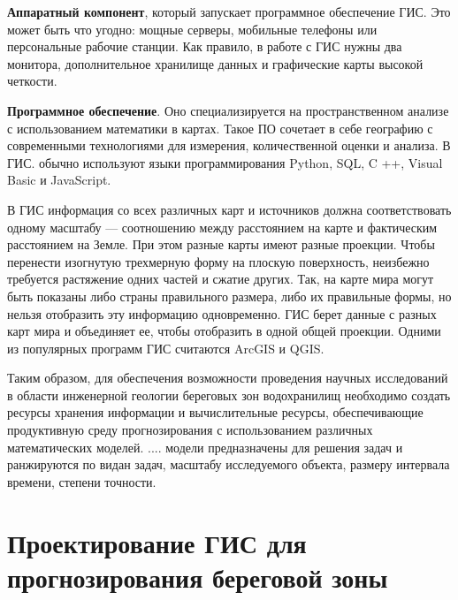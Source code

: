 \documentclass[732,14pt,final]{studrep}
\begin{document}
\textbf{Аппаратный компонент}, который запускает программное обеспечение ГИС. Это может быть что угодно: мощные серверы, мобильные телефоны или персональные рабочие станции. Как правило, в работе с ГИС нужны два монитора, дополнительное хранилище данных и графические карты высокой четкости.

\textbf{Программное обеспечение}. Оно специализируется на пространственном анализе с использованием математики в картах. Такое ПО сочетает в себе географию с современными технологиями для измерения, количественной оценки и анализа. В ГИС. обычно используют языки программирования Python, SQL, C ++, Visual Basic и JavaScript.

В ГИС информация со всех различных карт и источников должна соответствовать одному масштабу — соотношению между расстоянием на карте и фактическим расстоянием на Земле. При этом разные карты имеют разные проекции. Чтобы перенести изогнутую трехмерную форму на плоскую поверхность, неизбежно требуется растяжение одних частей и сжатие других. Так, на карте мира могут быть показаны либо страны правильного размера, либо их правильные формы, но нельзя отобразить эту информацию одновременно. ГИС берет данные с разных карт мира и объединяет ее, чтобы отобразить в одной общей проекции. Одними из популярных программ ГИС считаются ArcGIS и QGIS.




Таким образом, для обеспечения возможности проведения научных исследований в области инженерной геологии береговых зон водохранилищ необходимо создать ресурсы хранения информации и вычислительные ресурсы, обеспечивающие продуктивную среду прогнозирования с использованием различных математических моделей. .... модели предназначены для решения задач и ранжируются по видан задач, масштабу исследуемого объекта, размеру интервала времени, степени точности.



\chapter{Проектирование ГИС для прогнозирования береговой зоны}\label{chap:proj}
\end{document}
